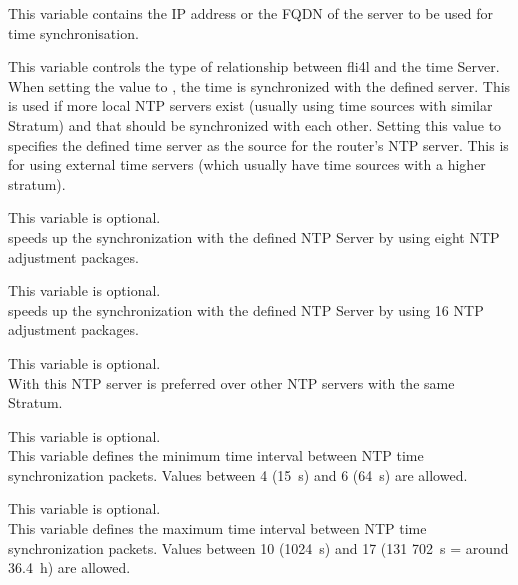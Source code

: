 \begin{description}

  This variable contains the IP address or the FQDN of the server to be used
  for time synchronisation.


  This variable controls the type of relationship between fli4l and the
  time Server. When setting the value to , the time is synchronized
  with the defined server. This is used if more local NTP servers exist
  (usually using time sources with similar Stratum) and that should be
  synchronized with each other. Setting this value to 
  specifies the defined time server as the source for the router's NTP server.
  This is for using external time servers (which usually have time sources with
  a higher stratum).


  This variable is optional.\\
   speeds up the synchronization with the defined NTP Server
  by using eight NTP adjustment packages.

  This variable is optional.\\
   speeds up the synchronization with the defined NTP Server
  by using 16 NTP adjustment packages.


  This variable is optional.\\
  With  this NTP server is preferred over other NTP servers with
  the same Stratum.


  This variable is optional.\\
  This variable defines the minimum time interval between
  NTP time synchronization packets. Values between 4 (15~s) and 6 (64~s)
  are allowed.

  This variable is optional.\\
  This variable defines the maximum time interval between
  NTP time synchronization packets. Values between 10 (1024~s) and 17
  (131 702~s = around 36.4~h) are allowed.


\end{description}
